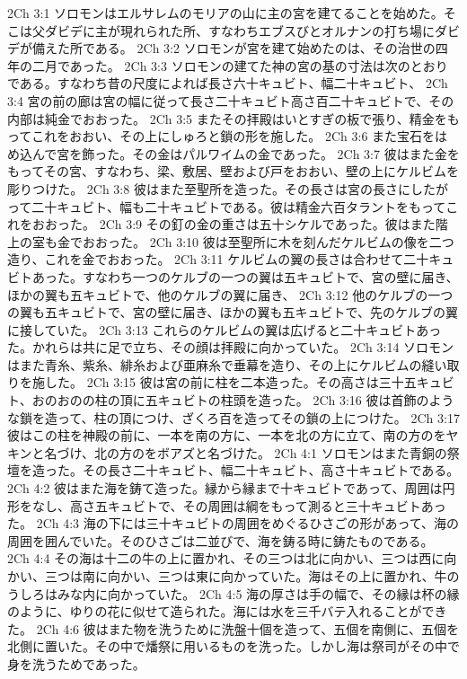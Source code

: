 2Ch 3:1  ソロモンはエルサレムのモリアの山に主の宮を建てることを始めた。そこは父ダビデに主が現れられた所、すなわちエブスびとオルナンの打ち場にダビデが備えた所である。
2Ch 3:2  ソロモンが宮を建て始めたのは、その治世の四年の二月であった。
2Ch 3:3  ソロモンの建てた神の宮の基の寸法は次のとおりである。すなわち昔の尺度によれば長さ六十キュビト、幅二十キュビト、
2Ch 3:4  宮の前の廊は宮の幅に従って長さ二十キュビト高さ百二十キュビトで、その内部は純金でおおった。
2Ch 3:5  またその拝殿はいとすぎの板で張り、精金をもってこれをおおい、その上にしゅろと鎖の形を施した。
2Ch 3:6  また宝石をはめ込んで宮を飾った。その金はパルワイムの金であった。
2Ch 3:7  彼はまた金をもってその宮、すなわち、梁、敷居、壁および戸をおおい、壁の上にケルビムを彫りつけた。
2Ch 3:8  彼はまた至聖所を造った。その長さは宮の長さにしたがって二十キュビト、幅も二十キュビトである。彼は精金六百タラントをもってこれをおおった。
2Ch 3:9  その釘の金の重さは五十シケルであった。彼はまた階上の室も金でおおった。
2Ch 3:10  彼は至聖所に木を刻んだケルビムの像を二つ造り、これを金でおおった。
2Ch 3:11  ケルビムの翼の長さは合わせて二十キュビトあった。すなわち一つのケルブの一つの翼は五キュビトで、宮の壁に届き、ほかの翼も五キュビトで、他のケルブの翼に届き、
2Ch 3:12  他のケルブの一つの翼も五キュビトで、宮の壁に届き、ほかの翼も五キュビトで、先のケルブの翼に接していた。
2Ch 3:13  これらのケルビムの翼は広げると二十キュビトあった。かれらは共に足で立ち、その顔は拝殿に向かっていた。
2Ch 3:14  ソロモンはまた青糸、紫糸、緋糸および亜麻糸で垂幕を造り、その上にケルビムの縫い取りを施した。
2Ch 3:15  彼は宮の前に柱を二本造った。その高さは三十五キュビト、おのおのの柱の頂に五キュビトの柱頭を造った。
2Ch 3:16  彼は首飾のような鎖を造って、柱の頂につけ、ざくろ百を造ってその鎖の上につけた。
2Ch 3:17  彼はこの柱を神殿の前に、一本を南の方に、一本を北の方に立て、南の方のをヤキンと名づけ、北の方のをボアズと名づけた。
2Ch 4:1  ソロモンはまた青銅の祭壇を造った。その長さ二十キュビト、幅二十キュビト、高さ十キュビトである。
2Ch 4:2  彼はまた海を鋳て造った。縁から縁まで十キュビトであって、周囲は円形をなし、高さ五キュビトで、その周囲は綱をもって測ると三十キュビトあった。
2Ch 4:3  海の下には三十キュビトの周囲をめぐるひさごの形があって、海の周囲を囲んでいた。そのひさごは二並びで、海を鋳る時に鋳たものである。
2Ch 4:4  その海は十二の牛の上に置かれ、その三つは北に向かい、三つは西に向かい、三つは南に向かい、三つは東に向かっていた。海はその上に置かれ、牛のうしろはみな内に向かっていた。
2Ch 4:5  海の厚さは手の幅で、その縁は杯の縁のように、ゆりの花に似せて造られた。海には水を三千バテ入れることができた。
2Ch 4:6  彼はまた物を洗うために洗盤十個を造って、五個を南側に、五個を北側に置いた。その中で燔祭に用いるものを洗った。しかし海は祭司がその中で身を洗うためであった。

